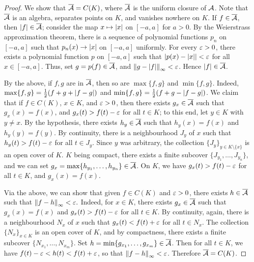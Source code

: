 \begin{proof}
    We show that $\overline{\mathcal{A}} = C(K)$, where $\overline{\mathcal{A}}$ is the uniform closure of $\mathcal{A}$. Note that $\overline{\mathcal{A}}$ is an algebra, separates points on $K$, and vanishes nowhere on $K$. If $f \in \overline{\mathcal{A}}$, then $\left| f \right| \in \overline{\mathcal{A}}$; consider the map $x \mapsto \left| x \right|$ on $[-a,a]$ for $a > 0$. By the Weierstrass approximation theorem, there is a sequence of polynomial functions $p_{n}$ on $[-a,a]$ such that $p_{n}(x) \to \left| x \right|$ on $[-a,a]$ uniformly. For every $\varepsilon > 0$, there exists a polynomial function $p$ on $[-a,a]$ such that $\left| p(x)-\left| x \right| \right| < \varepsilon$ for all $x \in [-a,a]$. Thus, set $g = p(f) \in \overline{\mathcal{A}}$, and $\left\lVert g-\left| f \right|\right\rVert_{\infty} < \varepsilon$. Hence $\left| f \right| \in \overline{\mathcal{A}}$.

    By the above, if $f,g$ are in $\overline{\mathcal{A}}$, then so are $\max\{f,g\}$ and $\min\{f,g\}$. Indeed, $\max\{f,g\} = \frac{1}{2}(f+g+\left| f-g \right|)$ and $\min\{f,g\} = \frac{1}{2}(f+g-\left| f-g \right|)$. We claim that if $f \in C(K)$, $x \in K$, and $\varepsilon > 0$, then there exists $g_{x} \in \overline{\mathcal{A}}$ such that $g_{x}(x) = f(x)$, and $g_{x}(t) > f(t)-\varepsilon$ for all $t \in K$; to this end, let $y \in K$ with $y \neq x$. By the hypothesis, there exists $h_{y} \in \overline{\mathcal{A}}$ such that $h_{y}(x) = f(x)$ and $h_{y}(y) = f(y)$. By continuity, there is a neighbourhood $J_{y}$ of $x$ such that $h_{y}(t) > f(t)-\varepsilon$ for all $t \in J_{y}$. Since $y$ was arbitrary, the collection $\{J_{y}\}_{y \in K \setminus \{x\}}$ is an open cover of $K$. $K$ being compact, there exists a finite subcover $\{J_{y_{1}},\ldots,J_{y_{n}}\}$, and we can set $g_{x} = \max\{h_{y_{1}},\ldots,h_{y_{n}}\} \in \overline{\mathcal{A}}$. On $K$, we have $g_{x}(t) > f(t)-\varepsilon$ for all $t \in K$, and $g_{x}(x) = f(x)$.

    Via the above, we can show that given $f \in C(K)$ and $\varepsilon > 0$, there exists $h \in \overline{\mathcal{A}}$ such that $\left\lVert f-h\right\rVert_{\infty} < \varepsilon.$ Indeed, for $x \in K$, there exists $g_{x} \in \overline{\mathcal{A}}$ such that $g_{x}(x) = f(x)$ and $g_{x}(t) > f(t)-\varepsilon$ for all $t \in K$. By continuity, again, there is a neighbourhood $N_{x}$ of $x$ such that $g_{x}(t) < f(t) + \varepsilon$ for all $t \in N_{x}$. The collection $\{N_{x}\}_{x \in K}$ is an open cover of $K$, and by compactness, there exists a finite subcover $\{N_{x_{1}},\ldots,N_{x_{m}}\}$. Set $h = \min\{g_{x_{1}},\ldots,g_{x_{m}}\} \in \overline{\mathcal{A}}$. Then for all $t \in K$, we have $f(t)-\varepsilon < h(t) < f(t)+\varepsilon$, so that $\left\lVert f-h\right\rVert_{\infty} < \varepsilon$. Therefore $\overline{\mathcal{A}} = C(K)$.
\end{proof}

